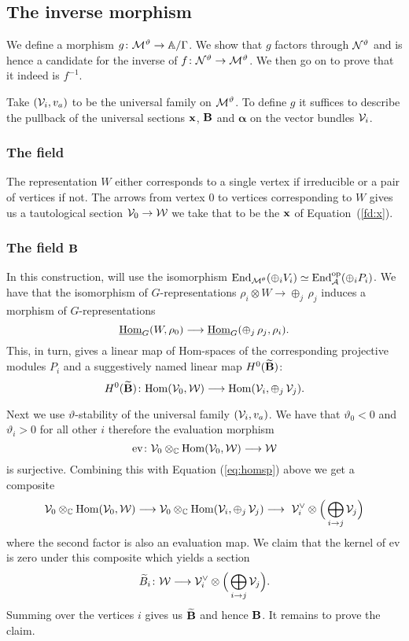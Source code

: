 \documentclass{amsart}
\newcommand{\balpha}{\boldsymbol{\alpha}}
\theoremstyle{definition}
\begin{document}
\subsection{The inverse morphism}

We define a morphism  $g \colon \mathcal{M}^\vartheta \rightarrow \mathbb{A}/\Gamma$.
We show that $g$ factors through $\mathcal{N}^\vartheta$ and is hence a candidate for the inverse of $f \colon \mathcal{N}^\vartheta \rightarrow \mathcal{M}^\vartheta$.
We then go on to prove that it indeed is $f^{-1}$.

Take $(\mathcal{V}_i, v_a)$ to be the universal family on $\mathcal{M}^\vartheta$.
To define $g$ it suffices to describe the pullback of the universal sections $\mathbf{x}$, $\mathbf{B}$ and $\balpha$ on the vector bundles $\mathcal{V}_i$.

\subsubsection{The field \bfx}

The representation $W$ either corresponds to a single vertex if irreducible or a pair of vertices if not.
The arrows from vertex $0$ to vertices corresponding to $W$ gives us a tautological section $\mathcal{V}_0 \rightarrow \mathcal{W}$ we take that to be the $\mathbf{x}$ of Equation~(\ref{fd:x}).

\subsubsection{The field $\mathbf{B}$}
In this construction, will use the isomorphism $\operatorname{End}_{\mathcal{M}^\theta}(\oplus_i V_i) \simeq \operatorname{End}^{\text{op}}_{\mathcal{A}}(\oplus_i P_i)$.
We have that the isomorphism of $G$-representations $\rho_i \otimes W \rightarrow \oplus_j\, \rho_j$ induces a morphism of $G$-representations $$\underline{\operatorname{Hom}}_G(W,\rho_0) \longrightarrow \underline{\operatorname{Hom}}_G(\oplus_j \, \rho_j, \rho_i).$$
This, in turn, gives a linear map of Hom-spaces of the corresponding projective modules $P_i$ and a suggestively named linear map $H^0(\widetilde{\mathbf{B}})$:
\begin{equation}\label{eq:homsp}
    H^0(\widetilde{\mathbf{B}}) \colon {\operatorname{Hom}}(\mathcal{V}_0, \mathcal{W}) \longrightarrow {\operatorname{Hom}}(\mathcal{V}_i, \oplus_j \, \mathcal{V}_j).
\end{equation}

Next we use $\vartheta$-stability of the universal family $(\mathcal{V}_i, v_a)$.
We have that $\vartheta_0<0$ and $\vartheta_i>0$ for all other $i$ therefore the evaluation morphism $$\text{ev} \colon \mathcal{V}_0 \otimes_{\mathbb{C}} {\operatorname{Hom}}(\mathcal{V}_0, \mathcal{W}) \longrightarrow \mathcal{W}$$ is surjective.
Combining this with Equation (\ref{eq:homsp}) above we get a composite
$$\mathcal{V}_0 \otimes_{\mathbb{C}} {\operatorname{Hom}}(\mathcal{V}_0, \mathcal{W}) \longrightarrow \mathcal{V}_0 \otimes_{\mathbb{C}} {\operatorname{Hom}}(\mathcal{V}_i, \oplus_j \, \mathcal{V}_j) \longrightarrow\ \mathcal{V}_i^\vee \otimes \Big(\bigoplus_{i \rightarrow j}\mathcal{V}_j\Big)$$
where the second factor is also an evaluation map.
We claim that the kernel of ev is zero under this composite which yields a section 
$$\widetilde{B}_i \colon \mathcal{W} \longrightarrow \mathcal{V}_i^\vee \otimes \Big(\bigoplus_{i \rightarrow j}\mathcal{V}_j\Big).$$
Summing over the vertices $i$ gives us $\widetilde{\mathbf{B}}$ and hence $\mathbf{B}$.
It remains to prove the claim.
\end{document}
